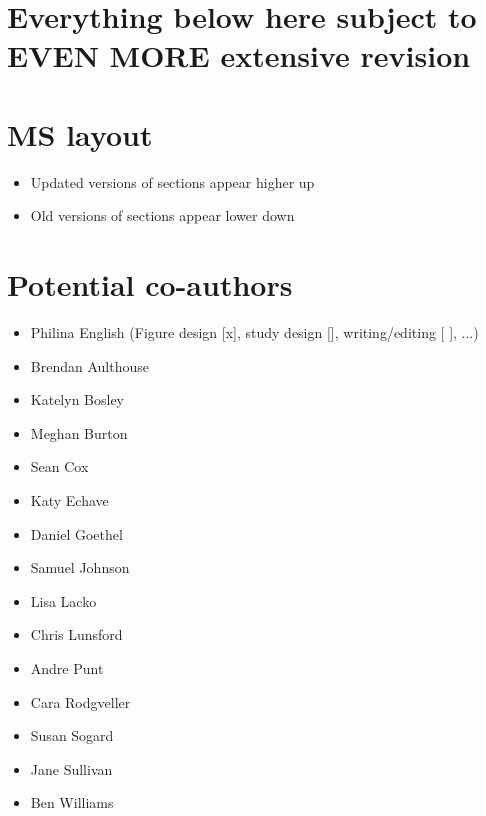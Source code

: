 \documentclass{article}
\begin{document}
\section{Everything below here subject to EVEN MORE extensive revision}

\vspace{20mm}



\section{MS layout}
\begin{itemize}
\item Updated versions of sections appear higher up
\item Old versions of sections appear lower down
\end{itemize}


\section{Potential co-authors}

\begin{itemize}
    \item Philina English (Figure design [x], study design [], writing/editing [ ], ...)
    \item Brendan Aulthouse %
    \item Katelyn Bosley %
    \item Meghan Burton %
    \item Sean Cox
    \item Katy Echave %
    \item Daniel Goethel %
    \item Samuel Johnson %
    \item Lisa Lacko %
    \item Chris Lunsford
    \item Andre Punt
    \item Cara Rodgveller
    \item Susan Sogard %
    \item Jane Sullivan
    \item Ben Williams
\end{itemize}
\end{document}
